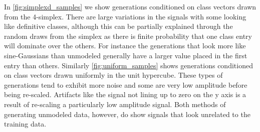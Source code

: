 \documentclass[12pt]{iopart}
\newcommand{\chris}[1]{\textbf{\textcolor{green}{CHRIS: #1}}}
\newcommand{\michael}[1]{\textbf{\textcolor{orange}{MICHAEL: #1}}}
\begin{document}
In \cref{fig:simplexd_samples} we show generations conditioned on class vectors drawn from the 4-simplex. There are large variations in the signals with some looking like definitive classes, although this can be partially explained through the random draws from the simplex as there is finite probability that one class entry will dominate over the others. For instance the generations that look more like sine-Gaussians than unmodeled generally have a larger value placed in the first entry than others. Similarly \cref{fig:uniform_samples} shows generations conditioned on class vectors drawn uniformly in the unit hypercube. These types of generations tend to exhibit more noise and some are very low amplitude before being re-scaled. Artifacts like the signal not lining up to zero on the y axis is a result of re-scaling a particularly low amplitude signal. Both methods of generating unmodeled data, however, do show signals that look unrelated to the training data. 

\end{document}
